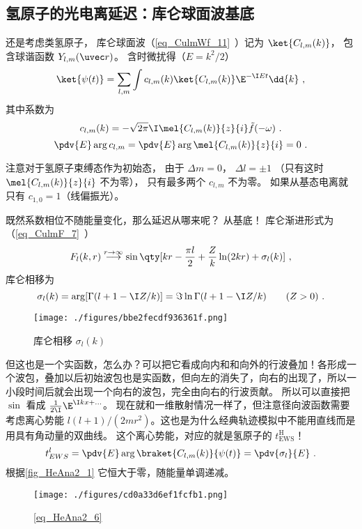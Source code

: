 \subsection{氢原子的光电离延迟：库仑球面波基底}\label{sub_HeAna2_1}
还是考虑类氢原子， 库仑球面波（\autoref{eq_CulmWf_11}~）记为 $\ket{C_{l,m}(k)}$， 包含球谐函数 $Y_{l,m}(\uvec r)$。 含时微扰得（$E = k^2/2$）
\begin{equation}\label{eq_HeAna2_4}
\ket{\psi(t)} = \sum_{l,m} \int c_{l,m}(k) \ket{C_{l,m}(k)} \E^{-\I E t} \dd{k}~,
\end{equation}
其中系数为
\begin{equation}
c_{l,m}(k) = -\sqrt{2\pi}\I \mel{C_{l,m}(k)}{z}{i} \tilde f(-\omega)~.
\end{equation}
\begin{equation}
\pdv{E}\arg c_{l,m} = \pdv{E} \arg \mel{C_{l,m}(k)}{z}{i} = 0~.
\end{equation}


注意对于氢原子束缚态作为初始态， 由于 $\Delta m = 0$， $\Delta l = \pm 1$ （只有这时 $\mel{C_{l,m}(k)}{z}{i}$ 不为零）， 只有最多两个 $c_{l,m}$ 不为零。 如果从基态电离就只有 $c_{1,0} = 1$（线偏振光）。 

既然系数相位不随能量变化，那么延迟从哪来呢？ 从基底！
库仑渐进形式为（\autoref{eq_CulmF_7}~）
\begin{equation}
F_l(k, r) \overset{r\to \infty}{\longrightarrow} \sin\qty[kr - \frac{\pi l}{2} + \frac{Z}{k}\ln(2kr) + \sigma_l(k)]~, %
\end{equation}
库仑相移为
\begin{equation}
\sigma_l(k) = \arg[\Gamma(l+1-\I Z/k)] = \Im\ln\Gamma(l+1-\I Z/k) \qquad (Z > 0)~.
\end{equation}
\begin{figure}[ht]
\centering
\texttt{[image: ./figures/bbe2fecdf936361f.png]}
\caption{库仑相移 $\sigma_l(k)$} \label{fig_HeAna2_1}
\end{figure}
但这也是一个实函数，怎么办？可以把它看成向内和和向外的行波叠加！各形成一个波包，叠加以后初始波包也是实函数，但向左的消失了，向右的出现了，所以一小段时间后就会出现一个向右的波包，完全由向右的行波贡献。 所以可以直接把 $\sin$ 看成 $\frac{1}{2\I}\E^{\I kx + \dots}$。 现在就和一维散射情况一样了，但注意径向波函数需要考虑离心势能 $l(l+1)/(2mr^2)$。这也是为什么经典轨迹模拟中不能用直线而是用具有角动量的双曲线。 这个离心势能，对应的就是氢原子的 $t_\text{EWS}^\text{H}$！
\begin{equation}
t_{EWS}^l = \pdv{E} \arg\braket{C_{l,m}(k)}{\psi(t)} = \pdv{\sigma_l}{E}~.
\end{equation}
根据\autoref{fig_HeAna2_1} 它恒大于零，随能量单调递减。
\begin{figure}[ht]
\centering
\texttt{[image: ./figures/cd0a33d6ef1fcfb1.png]}
\caption{\autoref{eq_HeAna2_6} } \label{fig_HeAna2_2}
\end{figure}

